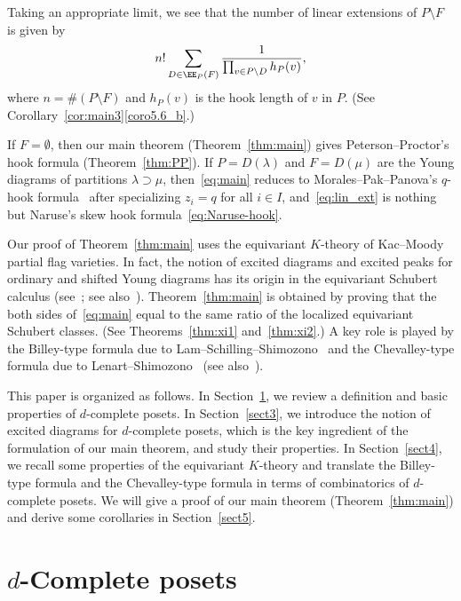 Taking an appropriate limit, we see that 
the number of linear extensions of $P \setminus F$ is given by
\begin{equation}
\label{eq:lin_ext}
n! 
\sum_{D \in \EE_P(F)}
 \frac{ 1 }
 { \prod_{v \in P \setminus D} h_P(v) },
\end{equation}
where $n = \# (P \setminus F)$ and $h_P(v)$ is the hook length of $v$ in $P$.
(See Corollary~\ref{cor:main3}\ref{coro5.6_b}.)

If $F = \emptyset$, then our main theorem (Theorem~\ref{thm:main}) gives 
Peterson--Proctor's hook formula (Theorem~\ref{thm:PP}).
If $P = D(\lambda)$ and $F = D(\mu)$ are the Young diagrams of partitions $\lambda \supset \mu$, 
then~\eqref{eq:main} reduces to Morales--Pak--Panova's $q$-hook formula~\cite[Corollary~6.17]{MPP} 
after specializing $z_i = q$ for all $i \in I$, 
and~\eqref{eq:lin_ext} is nothing but Naruse's skew hook formula~\eqref{eq:Naruse-hook}.

Our proof of Theorem~\ref{thm:main} uses the equivariant $K$-theory of Kac--Moody partial flag varieties.
In fact, the notion of excited diagrams and excited peaks for ordinary and shifted Young diagrams 
has its origin in the equivariant Schubert calculus 
(see~\cite{IN1, IN2}; see also~\cite{GK, KN, Kr1, Kr2}).
Theorem~\ref{thm:main} is obtained by proving that 
the both sides of~\eqref{eq:main} equal to the same ratio of the localized equivariant Schubert classes. 
(See Theorems~\ref{thm:xi1} and~\ref{thm:xi2}.)
A key role is played by the Billey-type formula due to Lam--Schilling--Shimozono~\cite{LSS} 
and the Chevalley-type formula due to Lenart--Shimozono~\cite{LS} (see also~\cite{LP}).

This paper is organized as follows.
In Section~\ref{sect2}, we review a definition and basic properties of $d$-complete posets.
In Section~\ref{sect3}, we introduce the notion of excited diagrams for $d$-complete posets, 
which is the key ingredient of the formulation of our main theorem, and study their properties.
In Section~\ref{sect4}, we recall some properties of the equivariant $K$-theory 
and translate the Billey-type formula and the Chevalley-type formula in terms of combinatorics 
of $d$-complete posets.
We will give a proof of our main theorem (Theorem~\ref{thm:main}) and derive some corollaries 
in Section~\ref{sect5}.


\section{%
\texorpdfstring{$d$}{d}-Complete posets
}\label{sect2}

